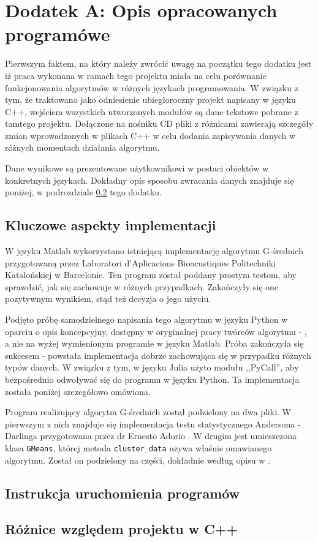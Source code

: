 \section*{Dodatek A: Opis opracowanych programówe}

\qquad Pierwszym faktem, na który należy zwrócić uwagę na początku tego dodatku jest iż praca wykonana w ramach tego projektu miała na celu porównanie funkcjonowania algorytmów w różnych językach programowania. W związku z tym, że traktowano jako odniesienie ubiegłoroczny projekt napisany w języku C++, wejściem wszystkich utworzonych modułów są dane tekstowe pobrane z tamtego projektu. Dołączone na nośniku CD pliki z różnicami zawierają szczegóły zmian wprowadzonych w plikach C++ w celu dodania zapisywania danych w różnych momentach działania algorytmu.

Dane wynikowe są prezentowane użytkownikowi w postaci obiektów w konkretnych językach. Dokładny opis sposobu zwracania danych znajduje się poniżej, w podrozdziale \ref{sub:instrukcja} tego dodatku.

\subsection{Kluczowe aspekty implementacji}

\qquad W języku Matlab wykorzystano istniejącą implementację algorytmu G-średnich przygotowaną przez Laboratori d'Aplicacions Bioacustiques Politechniki Katalońskiej w Barcelonie. Ten program został poddany prostym testom, aby sprawdzić, jak się zachowuje w różnych przypadkach. Zakończyły się one pozytywnym wynikiem, stąd też decyzja o jego użyciu.

Podjęto próbę samodzielnego napisania tego algorytmu w języku Python w oparciu o opis koncepcyjny, dostępny w oryginalnej pracy twórców algorytmu - \cite{GMeans}, a nie na wyżej wymienionym programie w języku Matlab. Próba zakończyła się sukcesem - powstała implementacja dobrze zachowująca się w przypadku różnych typów danych. W związku z tym, w języku Julia użyto modułu ,,PyCall'', aby bezpośrednio odwoływać się do programu w języku Python. Ta implementacja została poniżej szczegółowo omówiona.

Program realizujący algorytm G-średnich został podzielony na dwa pliki. W pierwszym z nich znajduje się implementacja testu statystycznego Andersona - Darlinga przygotowana przez dr Ernesto Adorio \cite{ad-test-python}. W drugim jest umieszczona klasa \texttt{GMeans}, której metoda \texttt{cluster\_data} używa właśnie omawianego algorytmu. Został on podzielony na części, dokładnie według opisu w \cite{GMeans}.

\subsection{Instrukcja uruchomienia programów}
\label{sub:instrukcja}

\subsection{Różnice względem projektu w C++}
